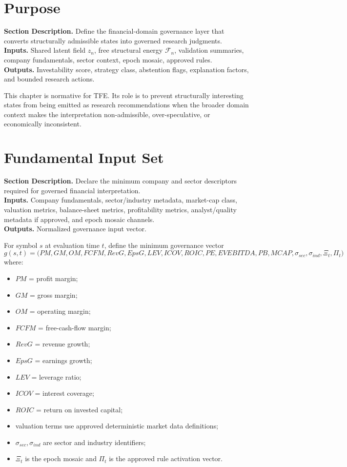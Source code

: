 \documentclass[11pt]{report}
\newcommand{\meta}[3]{\textbf{Section Description.} #1\\
\textbf{Inputs.} #2\\
\textbf{Outputs.} #3\par}
\begin{document}
\section{Purpose}
\meta{Define the financial-domain governance layer that converts structurally admissible states into governed research judgments.}{Shared latent field $z_n$, free structural energy $\mathcal{F}_n$, validation summaries, company fundamentals, sector context, epoch mosaic, approved rules.}{Investability score, strategy class, abstention flags, explanation factors, and bounded research actions.}

This chapter is normative for TFE. Its role is to prevent structurally interesting states from being emitted as research recommendations when the broader domain context makes the interpretation non-admissible, over-speculative, or economically inconsistent.

\section{Fundamental Input Set}
\meta{Declare the minimum company and sector descriptors required for governed financial interpretation.}{Company fundamentals, sector/industry metadata, market-cap class, valuation metrics, balance-sheet metrics, profitability metrics, analyst/quality metadata if approved, and epoch mosaic channels.}{Normalized governance input vector.}

For symbol $s$ at evaluation time $t$, define the minimum governance vector
\[
g(s,t)=\big(PM,GM,OM,FCFM,RevG,EpsG,LEV,ICOV,ROIC,PE,EVEBITDA,PB,MCAP,\sigma_{sec},\sigma_{ind},\Xi_t,\Pi_t\big)
\]
where:
\begin{itemize}
\item $PM$ = profit margin;
\item $GM$ = gross margin;
\item $OM$ = operating margin;
\item $FCFM$ = free-cash-flow margin;
\item $RevG$ = revenue growth;
\item $EpsG$ = earnings growth;
\item $LEV$ = leverage ratio;
\item $ICOV$ = interest coverage;
\item $ROIC$ = return on invested capital;
\item valuation terms use approved deterministic market data definitions;
\item $\sigma_{sec},\sigma_{ind}$ are sector and industry identifiers;
\item $\Xi_t$ is the epoch mosaic and $\Pi_t$ is the approved rule activation vector.
\end{itemize}
\end{document}
